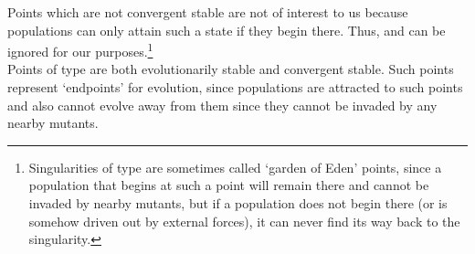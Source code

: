 Points which are not convergent stable are not of interest to us because populations can only attain such a state if they begin there. Thus,  and  can be ignored for our purposes.\footnote{Singularities of type  are sometimes called `garden of Eden' points, since a population that begins at such a point will remain there and cannot be invaded by nearby mutants, but if a population does not begin there (or is somehow driven out by external forces), it can never find its way back to the singularity.}\\
Points of type  are both evolutionarily stable and convergent stable. Such points represent `endpoints' for evolution, since populations are attracted to such points and also cannot evolve away from them since they cannot be invaded by any nearby mutants.

